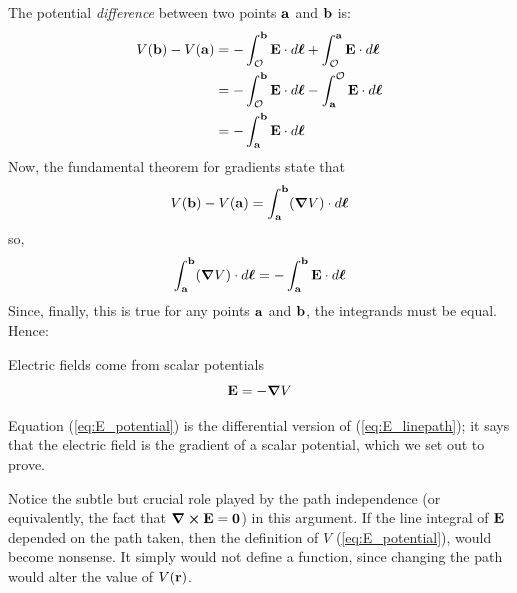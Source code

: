 		The potential \textit{difference} between two points $\vb a$ and $\vb b$ is:
		\begin{align*}
		    V(\vb b) - V(\vb a) 
			&= 
			-\int_{\mathcal{O}}^{\vb{b}} \vb{E}\cdot\dd{\vb*{\ell}} 
			+\int_{\mathcal{O}}^{\vb{a}} \vb{E}\cdot\dd{\vb*{\ell}} \\
			&= 
			-\int_{\mathcal{O}}^{\vb{b}} \vb{E}\cdot\dd{\vb*{\ell}} 
			-\int^{\mathcal{O}}_{\vb{a}} \vb{E}\cdot\dd{\vb*{\ell}} \\
			&= 
			-\int_{\vb{a}}^{\vb{b}} \vb{E}\cdot\dd{\vb*{\ell}} 
		\end{align*}
		Now, the fundamental theorem for gradients state that
		\begin{equation}
			V(\vb b) - V(\vb a) = \int_{\vb a}^{\vb b} (\grad V)\cdot \dd{\vb*{\ell}}
		\end{equation}
		so,
		\begin{equation}
			\int_{\vb a}^{\vb b} (\grad V)\cdot \dd{\vb*{\ell}}
			=
			-\int_{\vb{a}}^{\vb{b}} \vb{E}\cdot\dd{\vb*{\ell}} 
		\end{equation}
		Since, finally, this is true for any points $\vb{a}$ and $\vb{b}$, the 
		integrands must be equal. Hence:
		\begin{theorem}{Electric fields come from scalar potentials}
			\begin{equation}\label{eq:E_potential}
		       \vb{E} = -\grad V
			\end{equation} 
		\end{theorem}
		Equation (\ref{eq:E_potential}) is the differential version of (\ref{eq:E_linepath});
		it says that the electric field is the gradient of a scalar potential, which we set out
		to prove.

		Notice the subtle but crucial role played by the path independence (or equivalently,
		the fact that $\curl\vb{E}=\vb{0}$) in this argument. If the line integral of $\vb E$
		depended on the path taken, then the definition of $V$ (\ref{eq:E_potential}), would become nonsense.
		It simply would not define a function, since changing the path would alter the value of 
		$V(\vb r)$. 
		
